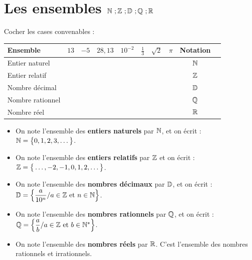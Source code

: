 \documentclass[10pt, a4paper]{article}
\begin{document}


\newpage

\pagestyle{cours}

\pagestyle{cours}

\section{Les ensembles $\mathbb{N} ~; \mathbb{Z} ~; \mathbb{D} ~; \mathbb{Q} ~; \mathbb{R}$ }

\begin{Activite}[][15 min]
Cocher les cases convenables :
\medskip
\renewcommand{\arraystretch}{1.5}
\begin{center}
\begin{tabular}{|l|c|c|c|c|c|c|c|c|c|}
\hline
\textbf{\textcolor{PrimaryColor}{Ensemble}}
  & $13$
  & $-5$
  & $28{,}13$
  & $10^{-2}$
  & $\frac{1}{3}$
  & $\sqrt{2}$
  & $\pi$
  & \textbf{\textcolor{PrimaryColor}{Notation}} \\
\hline
Entier naturel  & & & & & & & &  $\mathbb{N}$ \\
\hline
Entier relatif    & & & & & & &  & $\mathbb{Z}$ \\
\hline
Nombre décimal    & & & & & & &  & $\mathbb{D}$ \\
\hline
Nombre rationnel  & & & & & & &  & $\mathbb{Q}$ \\
\hline
Nombre réel       & & & & & & &  & $\mathbb{R}$ \\
\hline
\end{tabular}
\end{center}
\renewcommand{\arraystretch}{1}
\end{Activite}

\begin{Definition}[]
\begin{itemize}
    \item On note l'ensemble des \textbf{entiers naturels} par $\mathbb{N}$, et on écrit : 
    $\mathbb{N} = \big\{0, 1, 2, 3, \dots\big\}$.
    \item On note l'ensemble des \textbf{entiers relatifs} par $\mathbb{Z}$ et on écrit :
    $\mathbb{Z} = \big\{\dots, -2, -1, 0, 1, 2, \dots\big\}$.
    \item On note l'ensemble des \textbf{nombres décimaux} par $\mathbb{D}$, et on écrit : 
    $\mathbb{D} = \left\{ \dfrac{a}{10^n} / a \in \mathbb{Z} \text{ et } n \in \mathbb{N} \right\}$.
    \item On note l'ensemble des \textbf{nombres rationnels} par $\mathbb{Q}$, et on écrit : 
    $\mathbb{Q} = \left\{ \dfrac{a}{b} / a \in \mathbb{Z} \text{ et } b \in \mathbb{N}^* \right\}$.
    \item On note l'ensemble des \textbf{nombres réels} par $\mathbb{R}$. C'est l'ensemble des nombres rationnels et irrationnels.
\end{itemize}
\end{Definition}
\end{document}
